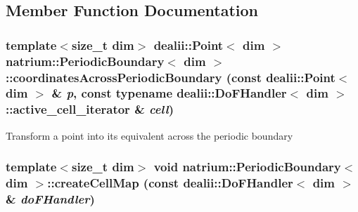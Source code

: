 \subsection{Member Function Documentation}
\hypertarget{classnatrium_1_1PeriodicBoundary_a9a5677bbc1d59499ceec15a7893b8688}{
\subsubsection[{coordinatesAcrossPeriodicBoundary}]{\setlength{\rightskip}{0pt plus 5cm}template$<$size\_\-t dim$>$ dealii::Point$<$ dim $>$ {\bf natrium::PeriodicBoundary}$<$ dim $>$::coordinatesAcrossPeriodicBoundary (const dealii::Point$<$ dim $>$ \& {\em p}, \/  const typename dealii::DoFHandler$<$ dim $>$::active\_\-cell\_\-iterator \& {\em cell})}}
\label{classnatrium_1_1PeriodicBoundary_a9a5677bbc1d59499ceec15a7893b8688}
Transform a point into its equivalent across the periodic boundary \hypertarget{classnatrium_1_1PeriodicBoundary_a233d460baa307b13bc32efb57c07f7c5}{
\subsubsection[{createCellMap}]{\setlength{\rightskip}{0pt plus 5cm}template$<$size\_\-t dim$>$ void {\bf natrium::PeriodicBoundary}$<$ dim $>$::createCellMap (const dealii::DoFHandler$<$ dim $>$ \& {\em doFHandler})}}
\label{classnatrium_1_1PeriodicBoundary_a233d460baa307b13bc32efb57c07f7c5}


